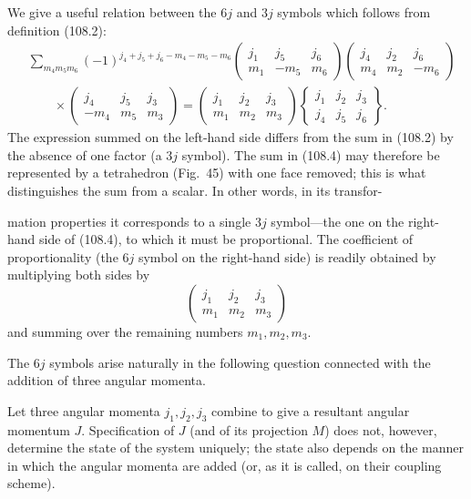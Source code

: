 We give a useful relation between the $6j$ and $3j$ symbols which follows from definition (108.2):
\begin{equation}
\begin{aligned}
&\sum_{m_4m_5m_6}(-1)^{j_4+j_5+j_6-m_4-m_5-m_6}
\begin{pmatrix}j_1&j_5&j_6\\m_1&-m_5&m_6\end{pmatrix}
\begin{pmatrix}j_4&j_2&j_6\\m_4&m_2&-m_6\end{pmatrix}\\
&\qquad\times\begin{pmatrix}j_4&j_5&j_3\\-m_4&m_5&m_3\end{pmatrix}
=\begin{pmatrix}j_1&j_2&j_3\\m_1&m_2&m_3\end{pmatrix}
\left\{\begin{matrix}j_1&j_2&j_3\\j_4&j_5&j_6\end{matrix}\right\}.
\end{aligned}
\tag{108.4}
\end{equation}
The expression summed on the left-hand side differs from the sum in (108.2) by the absence of one factor (a $3j$ symbol). The sum in (108.4) may therefore be represented by a tetrahedron (Fig.~45) with one face removed; this is what distinguishes the sum from a scalar. In other words, in its transfor-

mation properties it corresponds to a single $3j$ symbol---the one on the right-hand side of (108.4), to which it must be proportional. The coefficient of proportionality (the $6j$ symbol on the right-hand side) is readily obtained by multiplying both sides by
\[
\begin{pmatrix}j_1&j_2&j_3\\m_1&m_2&m_3\end{pmatrix}
\]
and summing over the remaining numbers $m_1,m_2,m_3$.

The $6j$ symbols arise naturally in the following question connected with the addition of three angular momenta.

Let three angular momenta $j_1,j_2,j_3$ combine to give a resultant angular momentum $J$. Specification of $J$ (and of its projection $M$) does not, however, determine the state of the system uniquely; the state also depends on the manner in which the angular momenta are added (or, as it is called, on their coupling scheme).

